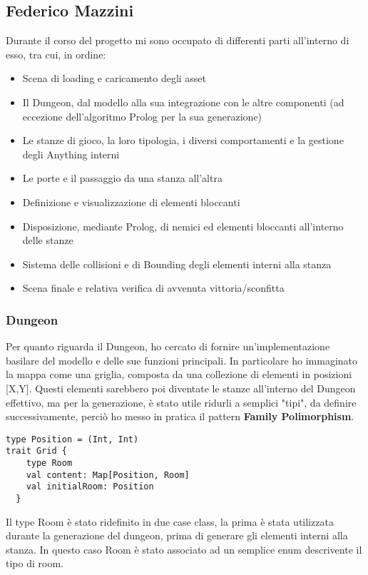 \subsection{Federico Mazzini}
Durante il corso del progetto mi sono occupato di differenti parti all'interno di esso, tra cui, in ordine:
\begin{itemize}
    \item Scena di loading e caricamento degli asset
    \item Il Dungeon, dal modello alla sua integrazione con le altre componenti (ad eccezione dell'algoritmo Prolog per la sua generazione)
    \item Le stanze di gioco, la loro tipologia, i diversi comportamenti e la gestione degli Anything interni
    \item Le porte e il passaggio da una stanza all'altra
    \item Definizione e visualizzazione di elementi bloccanti
    \item Disposizione, mediante Prolog, di nemici ed elementi bloccanti all'interno delle stanze
    \item Sistema delle collisioni e di Bounding degli elementi interni alla stanza
    \item Scena finale e relativa verifica di avvenuta vittoria/sconfitta
\end{itemize}

\subsubsection{Dungeon}
Per quanto riguarda il Dungeon, ho cercato di fornire un'implementazione basilare del modello e delle sue funzioni principali. 
In particolare ho immaginato la mappa come una griglia, composta da una collezione di elementi in posizioni [X,Y]. Questi elementi sarebbero poi diventate le stanze all'interno del Dungeon effettivo, 
ma per la generazione, è stato utile ridurli a semplici "tipi", da definire successivamente, perciò ho messo in pratica il pattern \textbf{Family Polimorphism}.

\begin{lstlisting}[basicstyle=\tiny]
type Position = (Int, Int)
trait Grid {
    type Room
    val content: Map[Position, Room]
    val initialRoom: Position
  }   
\end{lstlisting}
Il type Room è stato ridefinito in due case class, la prima è stata utilizzata durante la generazione del dungeon, prima di generare gli elementi interni alla stanza. 
In questo caso Room è stato associato ad un semplice enum descrivente il tipo di room. 

